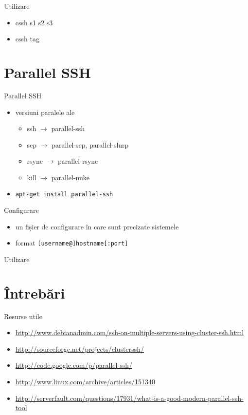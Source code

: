 \documentclass{simple}
\begin{document}
\begin{frame}{Utilizare}
	\begin{itemize}
		\item cssh s1 s2 s3
		\item cssh tag
	\end{itemize}
\end{frame}

\section{Parallel SSH}

\frame{\tableofcontents[currentsection]}

\begin{frame}{Parallel SSH}
	\begin{itemize}
		\item versiuni paralele ale
			\begin{itemize}
				\item ssh $\rightarrow$ parallel-ssh
				\item scp $\rightarrow$ parallel-scp, parallel-slurp
				\item rsync $\rightarrow$ parallel-rsync
				\item kill $\rightarrow$ parallel-nuke
			\end{itemize}
		\item \texttt{apt-get install parallel-ssh}
	\end{itemize}
\end{frame}

\begin{frame}{Configurare}
	\begin{itemize}
		\item un fișier de configurare în care sunt precizate sistemele
		\item format \texttt{[username@]hostname[:port]}
	\end{itemize}
\end{frame}

\begin{frame}{Utilizare}
	
\end{frame}

\section{Întrebări}

\frame{\tableofcontents[currentsection]}

\begin{frame}{Resurse utile}
	\begin{itemize}
		\item
		\url{http://www.debianadmin.com/ssh-on-multiple-servers-using-cluster-ssh.html}
		\item \url{http://sourceforge.net/projects/clusterssh/}
		\item \url{http://code.google.com/p/parallel-ssh/}
		\item \url{http://www.linux.com/archive/articles/151340}
		\item
		\url{http://serverfault.com/questions/17931/what-is-a-good-modern-parallel-ssh-tool}
	\end{itemize}
\end{frame}
\end{document}
